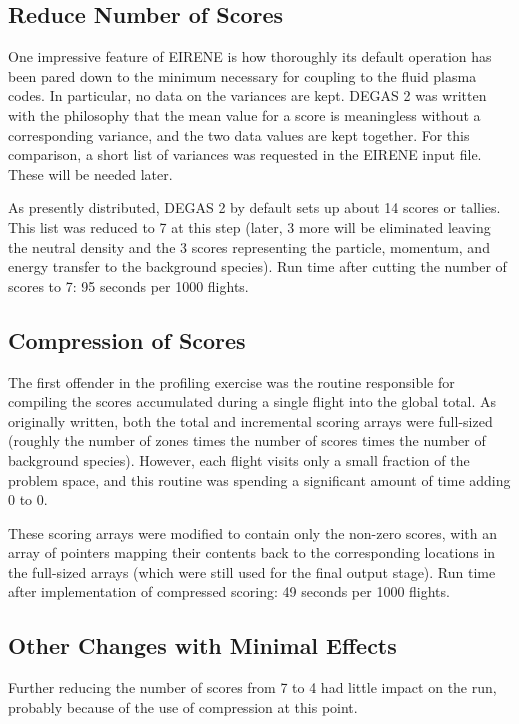 \documentclass[12pt]{report}
\begin{document}
\subsection{Reduce Number of Scores}

One impressive feature of EIRENE is how thoroughly its default operation
has been pared down to the minimum necessary for coupling to the fluid
plasma codes. In particular, no data on the variances are kept. DEGAS 2 was
written with the philosophy that the mean value for a score is meaningless
without a corresponding variance, and the two data values are kept
together. For this comparison, a short list of variances was requested
in the EIRENE input file. These will be needed later.

As presently distributed, DEGAS 2 by default sets up about 14 scores or
tallies. This list was reduced to 7 at this step (later, 3 more will
be eliminated leaving the neutral density and the 3 scores representing
the particle, momentum, and energy transfer to the background species).
Run time after cutting the number of scores to 7: 95 seconds per
1000 flights.

\subsection{Compression of Scores}

The first offender in the profiling exercise was the routine responsible
for compiling the scores accumulated during a single flight into the
global total. As originally written, both the total and incremental
scoring arrays were full-sized (roughly the
number of zones times the number of scores times the number of
background species). However, each flight visits only a small fraction
of the problem space, and this routine was spending a significant
amount of time adding $0$ to $0$.

These scoring arrays were modified to contain only the non-zero scores,
with an array of pointers mapping their contents back to the corresponding
locations in the full-sized arrays (which were still used for the
final output stage). Run time after implementation of compressed
scoring: 49 seconds per 1000 flights.

\subsection{Other Changes with Minimal Effects}

Further reducing the number of scores from  7 to 4 
had little impact on
the run, probably because of the use of
compression at this point.
\end{document}
